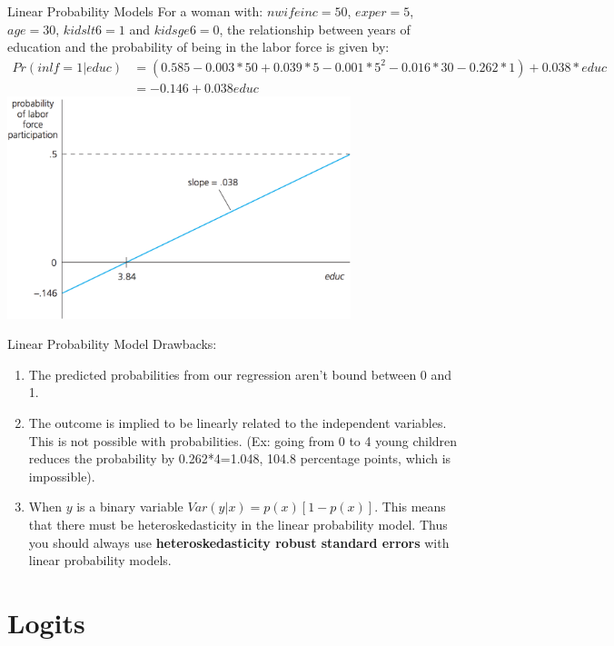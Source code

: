 \documentclass[
  ignorenonframetext,
]{beamer}
\begin{document}
\begin{frame}{Linear Probability Models}
\protect\hypertarget{linear-probability-models-3}{}
For a woman with: \(nwifeinc=50\), \(exper=5\), \(age=30\),
\(kidslt6=1\) and \(kidsge6=0\), the relationship between years of
education and the probability of being in the labor force is given by:
\tiny \[
\begin{aligned}
Pr(inlf=1|educ)&=(0.585-0.003*50+0.039*5-0.001*5^2-0.016*30-0.262*1)+0.038*educ\\
&=-0.146+0.038educ
\end{aligned}
\]
\includegraphics[width=0.75\textwidth,height=\textheight]{"images/Picture1.png"}
\end{frame}

\begin{frame}{Linear Probability Model Drawbacks:}
\protect\hypertarget{linear-probability-model-drawbacks}{}
\begin{enumerate}
[1)]
\item
  The predicted probabilities from our regression aren't bound between 0
  and 1.
\item
  The outcome is implied to be linearly related to the independent
  variables. This is not possible with probabilities. (Ex: going from 0
  to 4 young children reduces the probability by 0.262*4=1.048, 104.8
  percentage points, which is impossible).
\item
  When \(y\) is a binary variable \(Var(y|x)=p(x)[1-p(x)]\). This means
  that there must be heteroskedasticity in the linear probability model.
  Thus you should always use \textbf{heteroskedasticity robust standard
  errors} with linear probability models.
\end{enumerate}
\end{frame}

\hypertarget{logits}{%
\section{Logits}\label{logits}}
\end{document}
